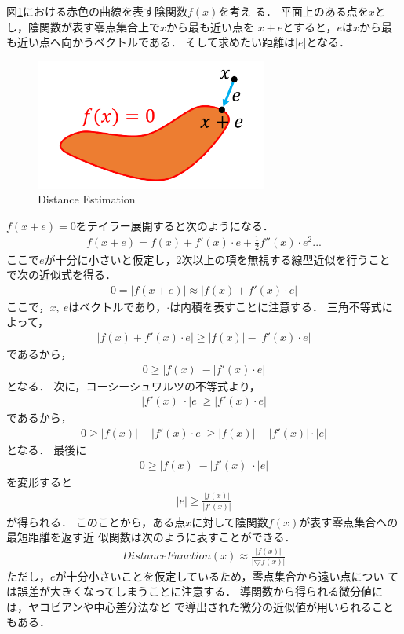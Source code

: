 図\ref{fig:distance-estimate}における赤色の曲線を表す陰関数$f(x)$を考え
る．
平面上のある点を$x$とし，陰関数が表す零点集合上で$x$から最も近い点を
$x + e$とすると，$e$は$x$から最も近い点へ向かうベクトルである．
そして求めたい距離は$|e|$となる．
 \begin{figure}[htbp]
  \center
  \includegraphics[width=3in, keepaspectratio]{../img/fractal/distance-estimate.pdf}
  \caption{Distance Estimation}
  \label{fig:distance-estimate}
 \end{figure}

\noindent$f(x + e) = 0$をテイラー展開すると次のようになる．
\begin{align*}
f(x + e) = f(x) + f'(x) \cdot e  + \frac{1}{2}f''(x) \cdot e^2 ...
\end{align*}
ここで$e$が十分に小さいと仮定し，2次以上の項を無視する線型近似を行うこと
で次の近似式を得る．
\begin{align*}
0=|f(x + e)| \approx |f(x) + f'(x) \cdot e|
\end{align*}
ここで，$x,~e$はベクトルであり，$\cdot$は内積を表すことに注意する．
三角不等式によって，
\begin{align*}
| f(x) + f'(x) \cdot e| \geq |f(x)| - |f'(x) \cdot e|
\end{align*}
であるから，
\begin{align*}
0 \geq |f(x)| - |f'(x) \cdot e|
\end{align*}
となる．
次に，コーシーシュワルツの不等式より，
\begin{align*}
 |f'(x)| \cdot |e| \geq | f'(x)\cdot e|
\end{align*}
であるから，
\begin{align*}
 0 \geq |f(x)| - |f'(x) \cdot e| \geq |f(x)| - |f'(x)| \cdot |e|
\end{align*}
となる．
最後に
\begin{align*}
0 \geq |f(x)| - |f'(x)| \cdot |e|
\end{align*}
を変形すると
\begin{align*}
|e| \geq \frac{|f(x)|}{|f'(x)|}
\end{align*}
が得られる．
このことから，ある点$x$に対して陰関数$f(x)$が表す零点集合への最短距離を返す近
似関数は次のように表すことができる．
\begin{align*}
 DistanceFunction(x) \approx \frac{|f(x)|}{|\bigtriangledown f(x)|}
\end{align*}
ただし，$e$が十分小さいことを仮定しているため，零点集合から遠い点につい
ては誤差が大きくなってしまうことに注意する．
導関数から得られる微分値には，ヤコビアンや中心差分法など
で導出された微分の近似値が用いられることもある．

